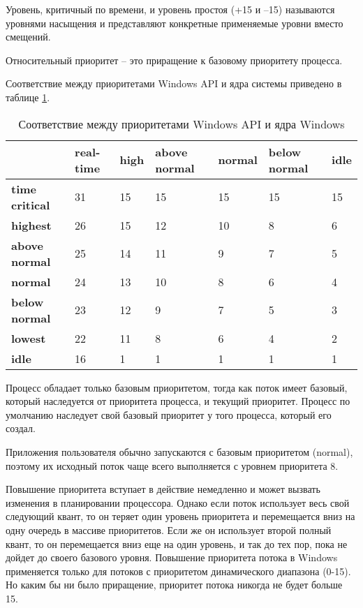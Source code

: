 Уровень, критичный по времени, и уровень простоя (+15 и –15) называются уровнями насыщения и представляют конкретные применяемые уровни вместо смещений.

Относительный приоритет -- это приращение к базовому приоритету процесса.
 

Соответствие между приоритетами Windows API и ядра системы приведено в таблице \ref{tbl:priority}.
\begin{table}[h]
	\caption{Соответствие между приоритетами Windows API и ядра Windows}
	\begin{center}
		\begin{tabular}{|l|p{45pt}|p{45pt}|p{45pt}|p{45pt}|p{45pt}|p{45pt}|} 
			\hline
			{} & \textbf{real-time} & \textbf{high} & \textbf{above normal} & \textbf{normal} & \textbf{below normal} & \textbf{idle}\\
			\hline
			\textbf{time critical} & 31 & 15 & 15 & 15 & 15 & 15 \\
			\hline
			\textbf{highest} & 26 & 15 & 12 & 10 & 8 & 6 \\
			\hline
			\textbf{above normal} & 25 & 14 & 11 & 9 & 7 & 5 \\
			\hline
			\textbf{normal} & 24 & 13 & 10 & 8 & 6 & 4 \\
			\hline
			\textbf{below normal} & 23 & 12 & 9 & 7 & 5 & 3 \\
			\hline
			\textbf{lowest} & 22 & 11 & 8 & 6 & 4 & 2 \\
			\hline
			\textbf{idle} & 16 & 1 & 1 & 1 & 1 & 1 \\
			\hline
		\end{tabular}
	\end{center}
	\label{tbl:priority}
\end{table}

Процесс обладает только базовым приоритетом, тогда как поток имеет базовый, который наследуется от приоритета процесса, и текущий приоритет. Процесс по умолчанию наследует свой базовый приоритет у того процесса, который его создал. 

Приложения пользователя обычно запускаются с базовым приоритетом (normal), поэтому их исходный поток чаще всего выполняется с уровнем приоритета 8. 


Повышение приоритета вступает в действие немедленно и может  вызвать изменения в планировании процессора. Однако если поток использует весь свой следующий квант, то он теряет один уровень приоритета и перемещается вниз на одну очередь в массиве приоритетов. Если же он использует второй полный квант, то он перемещается вниз еще  на один уровень, и так до тех пор, пока не дойдет до своего базового уровня. Повышение приоритета потока в Windows применяется только для потоков с приоритетом динамического диапазона (0-15). Но каким бы ни было приращение, приоритет потока никогда не будет больше 15. 

